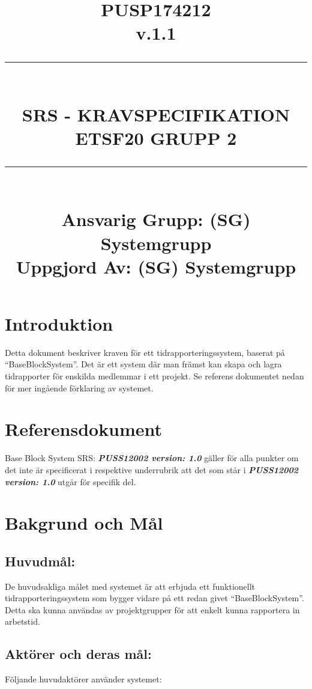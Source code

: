 \documentclass[paper=a4, fontsize=11pt,twoside]{article}
\title{
\documentNumber{#1}																						
\documentVersion{#2}																				
\HRule{0.5pt} \\ %
\LARGE \textbf{\uppercase{#3}} \\
\large \textbf{\uppercase{ETSF20 Grupp 2}} 
\HRule{2pt} \\ [1.5cm]    
\normalsize            
\documentResponsible{#4} \\ 
\documentCreator{#4}  
}
\newcommand{\HRule}[1]{\rule{\linewidth}{#1}}
\newcommand{\documentNumber}[1]{\centering PUSP1742#1 \\[1.0cm]}
\newcommand{\documentVersion}[1]{\centering \small{v.#1} \\[1.0cm]}
\newcommand{\documentResponsible}[1]{\centering  Ansvarig Grupp: #1}
\newcommand{\documentCreator}[1]{\centering Uppgjord Av: #1}
\newcommand{\grouptitlepage}[4]{ 
\title{
\documentNumber{#1}																						
\documentVersion{#2}																				
\HRule{0.5pt} \\ %
\LARGE \textbf{\uppercase{#3}} \\
\large \textbf{\uppercase{ETSF20 Grupp 2}} 
\HRule{2pt} \\ [1.5cm]    
\normalsize            
\documentResponsible{#4} \\ 
\documentCreator{#4}  
}																							
\maketitle																							
\thispagestyle{empty} 																	\newpage 				
 
}
\begin{document}
\grouptitlepage
{12}
{1.1}
{SRS - Kravspecifikation}
{(SG) Systemgrupp}	
\tableofcontents
\section{Introduktion}
Detta dokument beskriver kraven för ett tidrapporteringssystem, baserat på “BaseBlockSystem”. Det är ett system där man främst kan skapa och lagra tidrapporter för enskilda medlemmar i ett projekt. Se referens dokumentet nedan för mer ingående förklaring av systemet.
\section{Referensdokument}
Base Block System SRS: \textbf{\textit{PUSS12002 version: 1.0}}  gäller för alla punkter	 om det inte är specificerat i respektive underrubrik att det som står i \textbf{\textit{PUSS12002 version: 1.0}}  utgår för specifik del.

\newpage
\section{Bakgrund och Mål}
\subsection{Huvudmål:}
De huvudsakliga målet med systemet är att erbjuda ett funktionellt tidrapporteringssystem som bygger vidare på ett redan givet “BaseBlockSystem”. Detta ska kunna användas av projektgrupper för att enkelt kunna rapportera in arbetstid.
\subsection{Aktörer och deras mål:}
Följande huvudaktörer använder systemet:
\end{document}
